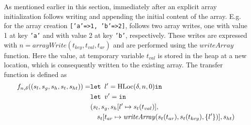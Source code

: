 As mentioned earlier in this section, immediately after an explicit array initialization follows writing and appending the initial content of the array. E.g. for the array creation \texttt{['a'=>1, 'b'=>2]}, follows two array writes, one with value 1 at key \texttt{'a'} and with value 2 at key \texttt{'b'}, respectively. These writes are expressed with $n = \mathit{arrayWrite}(t_{key},t_{val},t_{ar})$ and are performed using the $\mathit{writeArray}$ function. Here the value, at temporary variable $t_{val}$ is stored in the heap at a new location, which is consequently written to the existing array. The transfer function is defined as
\begin{align}
f_{n,\delta}((s_l, s_g, s_h, s_t, s_{ht})) = & \texttt{let } l' = \text{HLoc}(\delta, n, 0) \texttt{in }\notag\\
                            & \texttt{let } v' =  \texttt{in }\notag\\
                            &(s_l, s_g, s_h[l'\mapsto s_t(t_{val})], \notag\\
                            &\quad s_t[t_{ar} \mapsto \mathit{writeArray}(s_t(t_{ar}), s_t(t_{key}), \{l'\})], s_{ht})
\end{align}

